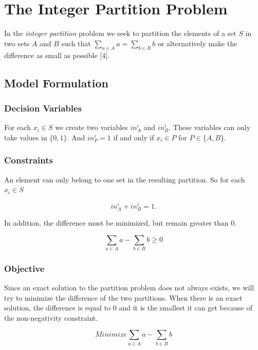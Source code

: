 \documentclass[11pt]{article}
\begin{document}
    \section{The Integer Partition
Problem}\label{the-integer-partition-problem}

In the \emph{integer partition} problem we seek to partition the
elements of a set \(S\) in two sets \(A\) and \(B\) such that
\(\sum_{a \in A} a = \sum_{b \in B} b\) or alternatively make the
difference as small as possible {[}4{]}.

\subsection{Model Formulation}\label{model-formulation}

\subsubsection{Decision Variables}\label{decision-variables}

For each \(x_i \in S\) we create two variables \(in_{A}^i\) and
\(in_{B}^i\). These variables can only take values in \(\{0,1\}\). And
\(in_{P}^i = 1\) if and only if \(x_i \in P\) for \(P \in \{A, B\}\).

\subsubsection{Constraints}\label{constraints}

An element can only belong to one set in the resulting partition. So for
each \(x_i \in S\)

\[in_A^i + in_B^i = 1.\]

In addition, the difference must be minimized, but remain greater than
0.

\[\sum_{a \in A}a - \sum_{b \in B}b \geq 0\]

\subsubsection{Objective}\label{objective}

Since an exact solution to the partition problem does not always
exists, we will try to minimize the difference of the two partitions.
When there is an exact solution, the difference is equal to \(0\) and it is
the smallest it can get because of the non-negativity constraint.

\[Minimize \sum_{a \in A}a - \sum_{b \in B}b\]
\end{document}
